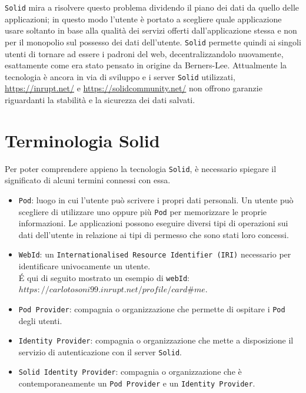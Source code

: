 \medskip

{\tt Solid} mira a risolvere questo problema dividendo il piano dei dati da quello delle applicazioni; in questo modo l'utente è portato a scegliere quale applicazione usare soltanto in base alla qualità dei servizi offerti dall'applicazione stessa e non per il monopolio sul possesso dei dati dell'utente. {\tt Solid} permette quindi ai singoli utenti di tornare ad essere i padroni del web, decentralizzandolo nuovamente, esattamente come era stato pensato in origine da Berners-Lee. Attualmente la tecnologia è ancora in via di sviluppo e i server {\tt Solid} utilizzati, \href{https://inrupt.net/}{https://inrupt.net/} e \href{https://solidcommunity.net/}{https://solidcommunity.net/} non offrono garanzie riguardanti la stabilità e la sicurezza dei dati salvati.

\section{Terminologia Solid}

\medskip

Per poter comprendere appieno la tecnologia {\tt Solid}, è necessario spiegare il significato di alcuni termini connessi con essa.

\medskip
\begin{itemize}
	\item {\tt Pod}: luogo in cui l'utente può scrivere i propri dati personali. Un utente può scegliere di utilizzare uno oppure più {\tt Pod} per memorizzare le proprie informazioni. Le applicazioni possono eseguire diversi tipi di operazioni sui dati dell'utente in relazione ai tipi di permesso che sono stati loro concessi.
	\item {\tt WebId}: un {\tt Internationalised Resource Identifier (IRI)} necessario per identificare univocamente un utente.\\É qui di seguito mostrato un esempio di {\tt webId}:\\
	\href{https://carlotosoni99.inrupt.net/profile/card#me}
	{$https://carlotosoni99.inrupt.net/profile/card\#me$}.
	\item {\tt Pod Provider}: compagnia o organizzazione che permette di ospitare i {\tt Pod} degli utenti.
	\item {\tt Identity Provider}: compagnia o organizzazione che mette a disposizione il servizio di autenticazione con il server {\tt Solid}.
	\item {\tt Solid Identity Provider}: compagnia o organizzazione che è contemporaneamente un {\tt Pod Provider} e un {\tt Identity Provider}.
\end{itemize}

